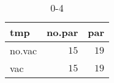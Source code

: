 %
\begin{table}[!tbp]
\caption{0-4\label{0-4}} 
\begin{center}
\begin{tabular}{lrr}
\hline\hline
\multicolumn{1}{l}{tmp}&\multicolumn{1}{c}{no.par}&\multicolumn{1}{c}{par}\tabularnewline
\hline
no.vac&$15$&$19$\tabularnewline
vac&$15$&$19$\tabularnewline
\hline
\end{tabular}
\end{center}
\end{table}

